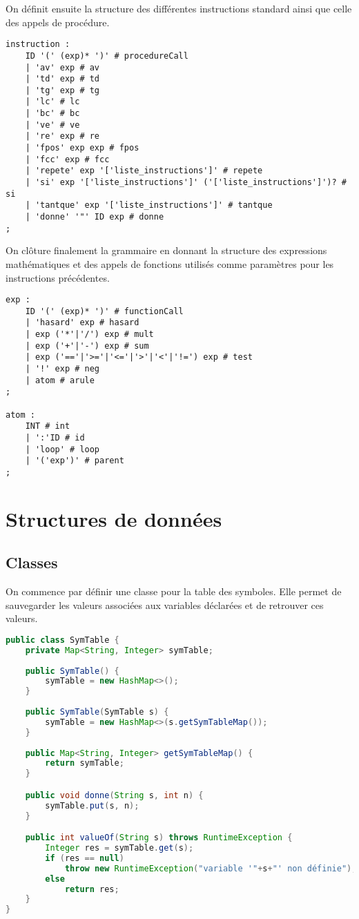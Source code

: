 \documentclass[a4paper,11pt]{article}
\begin{document}
On définit ensuite la structure des différentes instructions standard ainsi que celle des appels de procédure.
\begin{lstlisting}
instruction :
    ID '(' (exp)* ')' # procedureCall
    | 'av' exp # av
    | 'td' exp # td
    | 'tg' exp # tg
    | 'lc' # lc
    | 'bc' # bc
    | 've' # ve
    | 're' exp # re
    | 'fpos' exp exp # fpos
    | 'fcc' exp # fcc
    | 'repete' exp '['liste_instructions']' # repete
    | 'si' exp '['liste_instructions']' ('['liste_instructions']')? # si
    | 'tantque' exp '['liste_instructions']' # tantque
    | 'donne' '"' ID exp # donne
;
\end{lstlisting}

On clôture finalement la grammaire en donnant la structure des expressions mathématiques et des appels de fonctions utilisés comme paramètres pour les instructions précédentes.
\begin{lstlisting}
exp :
    ID '(' (exp)* ')' # functionCall
    | 'hasard' exp # hasard
    | exp ('*'|'/') exp # mult
    | exp ('+'|'-') exp # sum
    | exp ('=='|'>='|'<='|'>'|'<'|'!=') exp # test
    | '!' exp # neg
    | atom # arule
;

atom :
    INT # int
    | ':'ID # id
    | 'loop' # loop
    | '('exp')' # parent
;
\end{lstlisting}

\section{Structures de données}
\subsection{Classes}
On commence par définir une classe pour la table des symboles.
Elle permet de sauvegarder les valeurs associées aux variables déclarées et de retrouver ces valeurs.
\begin{lstlisting}[language=Java]
public class SymTable {
    private Map<String, Integer> symTable;
    
    public SymTable() {
        symTable = new HashMap<>();
    }
    
    public SymTable(SymTable s) {
        symTable = new HashMap<>(s.getSymTableMap());
    }
    
    public Map<String, Integer> getSymTableMap() {
        return symTable;
    }

    public void donne(String s, int n) {
        symTable.put(s, n);
    }

    public int valueOf(String s) throws RuntimeException {
        Integer res = symTable.get(s);
        if (res == null)
            throw new RuntimeException("variable '"+s+"' non définie");
        else
            return res;
    }
}
\end{lstlisting}
\end{document}
